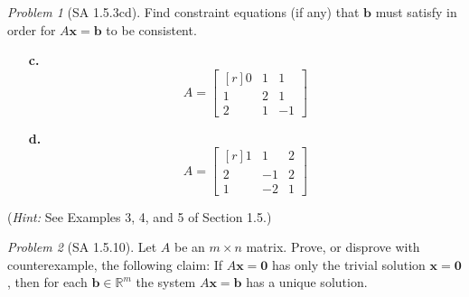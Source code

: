 \documentclass[fleqn,11pt]{paper}
\theoremstyle{remark}
\newtheorem{problem}{Problem}
\newcommand\R{\mathbb{R}}
\renewcommand{\vec}[1]{\mathbf{#1}}
\newcommand\vb{\vec{b}}
\newcommand\vx{\vec{x}}
\newcommand\vzero{\vec{0}}
\newcommand\Span{\ensuremath{\operatorname{Span}}}
\begin{document}
\newpage


\begin{problem}[SA 1.5.3cd]
  Find constraint equations (if any) that $\vb$ must satisfy in order for
  $A\vx = \vb$ to be consistent. 
\begin{multicols}{2}
\begin{enumerate}
\item[{\bf c.}] \[A = \begin{bmatrix*}[r]0&1&1\\1&2&1\\2&1&-1\end{bmatrix*}\]
\item[{\bf d.}] \[A = \begin{bmatrix*}[r]1&1&2\\2&-1&2\\1&-2&1\end{bmatrix*}\]
\end{enumerate}
\end{multicols}
\noindent ({\it Hint:} See Examples 3, 4, and 5 of Section 1.5.)
\end{problem}


\newpage

\begin{problem}[SA 1.5.10]
  Let $A$ be an $m \times n$ matrix. Prove, or disprove with counterexample,
  the following claim:
  If $A\vx = \vzero$ has only the trivial solution $\vx = \vzero$, then for each 
  $\vb\in \R^m$ the system $A\vx = \vb$ has a unique solution.
\end{problem}
\end{document}
